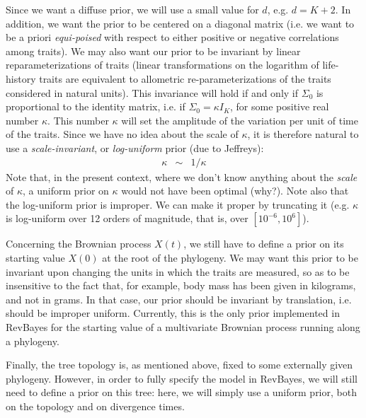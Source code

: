 \documentclass[usletter]{article}
\begin{document}
Since we want a diffuse prior, we will use a small value for $d$, e.g. $d=K+2$.
In addition, we want the prior to be centered on a diagonal matrix (i.e. we want to be a priori \emph{equi-poised} with respect to either positive or negative correlations among traits). We may also want our prior to be invariant by linear reparameterizations of traits (linear transformations on the logarithm of life-history traits are equivalent to allometric re-parameterizations of the traits considered in natural units). This invariance will hold if and only if $\Sigma_0$ is proportional to the identity matrix, i.e. if $\Sigma_0 = \kappa I_K$, for some positive real number $\kappa$. This number $\kappa$ will set the amplitude of the variation per unit of time of the traits. Since we have no idea about the scale of $\kappa$, it is therefore natural to use a \emph{scale-invariant}, or \emph{log-uniform} prior (due to Jeffreys):
\begin{eqnarray*}
\kappa &\sim& 1/\kappa
\end{eqnarray*}
Note that, in the present context, where we don't know anything about the \emph{scale} of $\kappa$, a uniform prior on $\kappa$ would not have been optimal (why?).
Note also that the log-uniform prior is improper. We can make it proper by truncating it (e.g. $\kappa$ is log-uniform over 12 orders of magnitude, that is, over $[10^{-6}, 10^{6}]$).

Concerning the Brownian process $X(t)$, we still have to define a prior on its starting value $X(0)$ at the root of the phylogeny. We may want this prior to be invariant upon changing the units in which the traits are measured, so as to be insensitive to the fact that, for example, body mass has been given in kilograms, and not in grams. In that case, our prior should be invariant by translation, i.e. should be improper uniform. Currently, this is the only prior implemented in RevBayes for the starting value of a multivariate Brownian process running along a phylogeny.

Finally, the tree topology is, as mentioned above, fixed to some externally given phylogeny. However, in order to fully specify the model in RevBayes, we will still need to define a prior on this tree: here, we will simply use a uniform prior, both on the topology and on divergence times.
\end{document}
